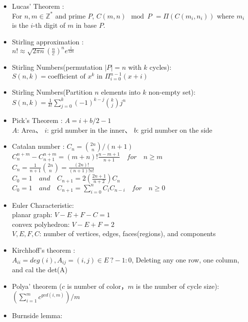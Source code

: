 \begin{itemize}
    \item Lucas’ Theorem :\\
      For $n, m \in \mathbb{Z}^{*}$ and prime $P$,
      $C(m,n) \mod P$
        $= \Pi ( C(m_i,n_i) )$
      where $m_i$ is the $i$-th digit of $m$ in base $P$.
    \item Stirling approximation : \\
      $n!\approx\sqrt{ 2 \pi n}(\frac{n}{e})^{n}e^\frac{1}{12n}$
    \item Stirling Numbers(permutation $|P|=n$ with $k$ cycles): \\
      $S(n,k) = \text{coefficient of }x^k \text{ in } \Pi_{i=0}^{n-1} (x+i)$
    \item Stirling Numbers(Partition $n$ elements into $k$ non-empty set): \\
      $S(n,k) = \frac{1}{k!} \sum\limits_{j=0}^k (-1)^{k-j} {k \choose j} j^n$
    \item Pick’s Theorem : $A = i + b/2 - 1$\\
      $A$: Area、 $i$: grid number in the inner、 $b$: grid number on the side
    \item Catalan number : $C_n = {2n \choose n}/(n+1)$\\
      $C^{n+m}_{n}-C^{n+m}_{n+1} = (m+n)! \frac{n-m+1}{n+1}\quad for \quad  n \ge m$\\
      $C_n = \frac{1}{n+1}{2n \choose n} = \frac{(2n)!}{(n+1)!n!}$\\
      $C_0 = 1 \quad  and \quad C_{n+1}= 2(\frac{2n+1}{n+2})C_n$\\
      $C_0 = 1 \quad  and \quad C_{n+1} = \sum_{i=0}^{n} C_iC_{n-i} \quad for \quad  n \ge 0$
    \item Euler Characteristic: \\
      planar graph: $V-E+F-C=1$ \\
      convex polyhedron: $V-E+F=2$ \\
      $V,E,F,C$: number of vertices, edges, faces(regions), and components
    \item Kirchhoff's theorem : \\
      $A_{ii} = deg(i), A_{ij} = (i,j) \in E\ ? -1 : 0$,
      Deleting any one row, one column, and cal the det(A)
    \item Polya' theorem ($c$ is number of color，$m$ is the number of cycle size): \\
      $(\sum_{i=1}^{m}{c^{gcd(i,m)}})/m$
    \item Burnside lemma: \\

\end{itemize}
